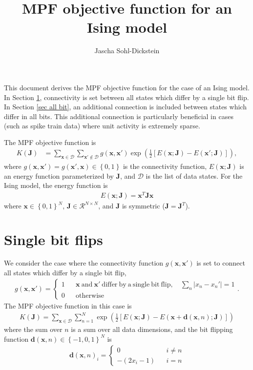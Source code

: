 \documentclass{article}
\title{MPF objective function for an Ising model}
\author{
Jascha Sohl-Dickstein
}
\newcommand{\mb}{\mathbf}
\begin{document}
\maketitle

This document derives the MPF objective function for the case of an Ising model.  In Section \ref{sec single bit}, connectivity is set between all states which differ by a single bit flip.  In Section \ref{sec all bit}, an additional connection is included between states which differ in all bits.  This additional connection is particularly beneficial in cases (such as spike train data) where unit activity is extremely sparse.

The MPF objective function is
\begin{align}
K\left( \mb J \right) & = \sum_{\mb x \in \mathcal D} \sum_{\mb x' \notin \mathcal D} g\left( \mb x, \mb x' \right) \exp\left( \frac{1}{2}\left[
E(\mb x; \mb J ) - E(\mb x'; \mb J) \right] \right)
,
\end{align}
where $g\left( \mb x, \mb x' \right) = g\left( \mb x', \mb x \right) \in \left\{ 0, 1 \right\}$ is the connectivity function, $E(\mb x; \mb J )$ is an energy function parameterized by $\mb J$, and $\mathcal D$ is the list of data states.  For the Ising model, the energy function is
\begin{align}
E\left( \mb x; \mb J\right) = \mb x^T \mb J \mb x
\end{align}
where $\mb x \in \left\{ 0, 1 \right\}^N$, $\mb J \in \mathcal R^{N\times N}$, and $\mb J$ is symmetric ($\mb J = \mb J^T$).

\section{Single bit flips}\label{sec single bit}

We consider the case where the connectivity function $g\left( \mb x, \mb x' \right)$ is set to connect all states which differ by a single bit flip,
\begin{align}
g\left( \mb x, \mb x' \right)
 =
	\left\{\begin{array}{ccrl}
1 & & \mb x \mathrm{\ and\ } \mb x' \mathrm{\ differ\ by\ a\ single\ bit\ flip,\ }  & \sum_n \left| x_n - x_n' \right| = 1  \\
0 & & \mathrm{otherwise} & 
	\end{array}\right.
\label{trans}
.
\end{align}
The MPF objective function in this case is
\begin{align}
K\left( \mb J \right) = \sum_{\mb x \in \mathcal D} \sum_{n=1}^N \exp\left( \frac{1}{2}\left[
E(\mb x; \mb J) - E(\mb x + {\mb d}(\mb x, n); \mb J) \right] \right)
\end{align}
where the sum over $n$ is a sum over all data dimensions, and the bit flipping function ${\mb d}(\mb x, n) \in \left\{ -1, 0, 1 \right\}^N$ is
\begin{align}
{\mb d}(\mb x, n)_i =
	\left\{\begin{array}{ccc}
0 & & i \neq n \\
-(2 x_i - 1) & & i = n
	\end{array}\right.
\end{align}
\end{document}
